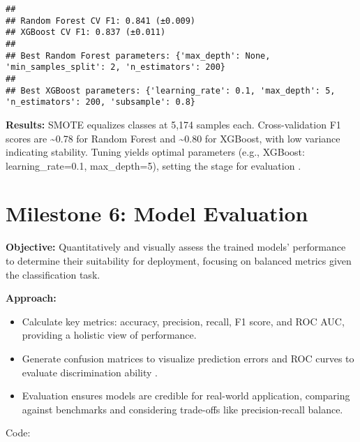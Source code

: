 \documentclass[preprint, 3p,
authoryear]{elsarticle} %
\providecommand{\tightlist}{%
  \setlength{\itemsep}{0pt}\setlength{\parskip}{0pt}}
\begin{document}
\begin{verbatim}
## 
## Random Forest CV F1: 0.841 (±0.009)
## XGBoost CV F1: 0.837 (±0.011)
## 
## Best Random Forest parameters: {'max_depth': None, 'min_samples_split': 2, 'n_estimators': 200}
## 
## Best XGBoost parameters: {'learning_rate': 0.1, 'max_depth': 5, 'n_estimators': 200, 'subsample': 0.8}
\end{verbatim}

\textbf{Results:} SMOTE equalizes classes at 5,174 samples each.
Cross-validation F1 scores are \textasciitilde0.78 for Random Forest and
\textasciitilde0.80 for XGBoost, with low variance indicating stability.
Tuning yields optimal parameters (e.g., XGBoost: learning\_rate=0.1,
max\_depth=5), setting the stage for evaluation \citep{ding2018model}.

\section{Milestone 6: Model
Evaluation}\label{milestone-6-model-evaluation}

\textbf{Objective:} Quantitatively and visually assess the trained
models' performance to determine their suitability for deployment,
focusing on balanced metrics given the classification task.

\textbf{Approach:}

\begin{itemize}
\tightlist
\item
  Calculate key metrics: accuracy, precision, recall, F1 score, and ROC
  AUC, providing a holistic view of performance.
\item
  Generate confusion matrices to visualize prediction errors and ROC
  curves to evaluate discrimination ability \citep{mcavaney2001model}.
\item
  Evaluation ensures models are credible for real-world application,
  comparing against benchmarks and considering trade-offs like
  precision-recall balance.
\end{itemize}

Code:
\end{document}
